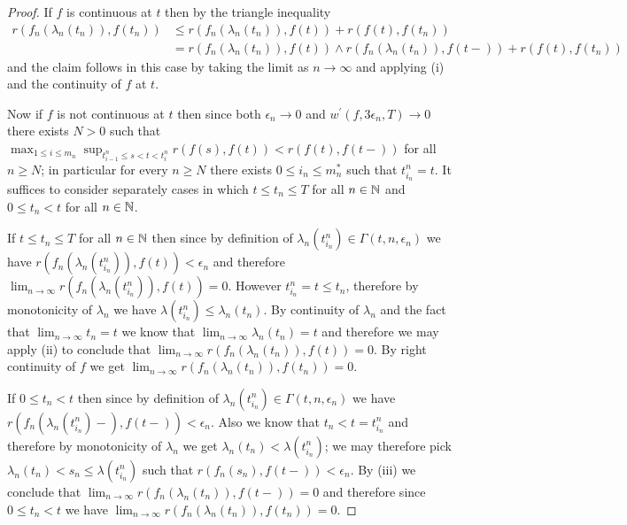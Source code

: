 \begin{proof}
If $f$ is continuous at $t$ then by the triangle inequality
\begin{align*}
r(f_n(\lambda_n(t_n)), f(t_n)) &\leq r(f_n(\lambda_n(t_n)), f(t)) + r(f(t), f(t_n)) \\
&=r(f_n(\lambda_n(t_n)), f(t)) \wedge r(f_n(\lambda_n(t_n)), f(t-)) + r(f(t), f(t_n)) 
\end{align*}
and the claim follows in this case by taking the limit as $n \to \infty$ and applying (i) and the continuity of $f$ at $t$.

Now if $f$ is not continuous at $t$ then since both $\epsilon_n \to 0$ and $w^\prime(f, 3\epsilon_n, T) \to 0$ there exists $N > 0$ such that $\max_{1 \leq i \leq m_n} \sup_{t^n_{i-1} \leq s < t < t^n_i} r(f(s), f(t)) < r(f(t), f(t-))$ for all $n \geq N$; in particular for every $n \geq N$ there exists $0 \leq i_n \leq m^*_n$ such that $t^n_{i_n} = t$.  It suffices to consider separately cases in which $t \leq t_n \leq T$ for all $n \in \mathbb{N}$ and $0 \leq t_n < t$ for all $n \in \mathbb{N}$.  

If $t \leq t_n \leq T$ for all $n \in \mathbb{N}$ then since by definition of $\lambda_n(t^n_{i_n}) \in \Gamma(t, n, \epsilon_n)$ we have $r(f_n(\lambda_n(t^n_{i_n})), f(t)) < \epsilon_n$ and therefore $\lim_{n \to \infty} r(f_n(\lambda_n(t^n_{i_n})), f(t)) = 0$.  However $t^n_{i_n} = t \leq t_n$, therefore by monotonicity of $\lambda_n$ we have $\lambda(t^n_{i_n} ) \leq \lambda_n(t_n)$.  By continuity of $\lambda_n$ and the fact that $\lim_{n \to \infty} t_n = t$ we know that $\lim_{n \to \infty} \lambda_n(t_n) = t$ and therefore we may apply (ii) to conclude that $\lim_{n \to \infty} r(f_n(\lambda_n(t_n)), f(t)) = 0$.  By right continuity of $f$ we get $\lim_{n \to \infty} r(f_n(\lambda_n(t_n)), f(t_n)) = 0$.

If $0 \leq t_n < t$ then since by definition of $\lambda_n(t^n_{i_n}) \in \Gamma(t, n, \epsilon_n)$ we have $r(f_n(\lambda_n(t^n_{i_n})-), f(t-)) < \epsilon_n$.  Also we know that 
$t_n < t = t^n_{i_n}$ and therefore by monotonicity of $\lambda_n$ we get $\lambda_n(t_n) < \lambda(t^n_{i_n})$; we may therefore pick $\lambda_n(t_n) < s_n \leq \lambda(t^n_{i_n})$
such that $r(f_n(s_n), f(t-)) < \epsilon_n$.  By (iii) we conclude that $\lim_{n \to \infty} r(f_n(\lambda_n(t_n)), f(t-)) = 0$ and therefore since $0 \leq t_n < t$ we have $\lim_{n \to \infty} r(f_n(\lambda_n(t_n)), f(t_n))=0$.
\end{proof}

